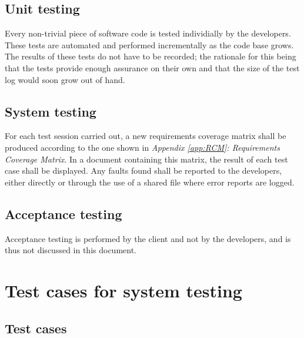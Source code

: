\documentclass[12pt,titlepage]{article}
\begin{document}
\subsection{Unit testing}
\label{subsec:test-recording-procedure-unit-testing}

Every non-trivial piece of software code is tested individially by the
developers. These tests are automated and performed incrementally as the
code base grows. The results of these tests do not have to be recorded; the
rationale for this being that the tests provide enough assurance on their own
and that the size of the test log would soon grow out of hand.

%
%

\subsection{System testing}
\label{subsec:test-recording-procedure-system-testing}

For each test session carried out, a new requirements coverage matrix shall be
produced according to the one shown in \textit{Appendix \ref{app:RCM}:
Requirements Coverage Matrix}. In a document containing this matrix, the result
of each test case shall be displayed. Any faults found shall be reported to the
developers, either directly or through the use of a shared file where error
reports are logged.

\subsection{Acceptance testing}
\label{subsec:test-recording-procedure-acceptance-testing}

Acceptance testing is performed by the client and not by the developers, and is
thus not discussed in this document.



\section{Test cases for system testing}
\label{sec:test-cases-for-system-testing}

\subsection{Test cases}
\label{subsec:test-cases}
\end{document}
